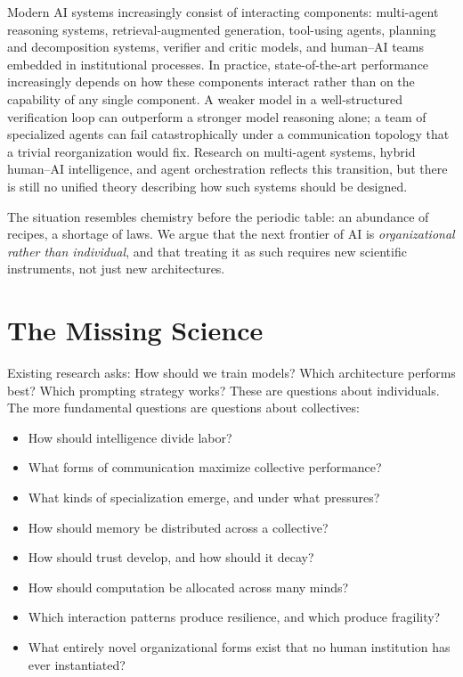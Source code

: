 \documentclass{article}
\begin{document}
Modern AI systems increasingly consist of interacting components: multi-agent reasoning systems, retrieval-augmented generation, tool-using agents, planning and decomposition systems, verifier and critic models, and human--AI teams embedded in institutional processes. In practice, state-of-the-art performance increasingly depends on how these components interact rather than on the capability of any single component. A weaker model in a well-structured verification loop can outperform a stronger model reasoning alone; a team of specialized agents can fail catastrophically under a communication topology that a trivial reorganization would fix. Research on multi-agent systems, hybrid human--AI intelligence, and agent orchestration reflects this transition, but there is still no unified theory describing how such systems should be designed.

The situation resembles chemistry before the periodic table: an abundance of recipes, a shortage of laws. We argue that the next frontier of AI is \emph{organizational rather than individual}, and that treating it as such requires new scientific instruments, not just new architectures.

\section{The Missing Science}

Existing research asks: How should we train models? Which architecture performs best? Which prompting strategy works? These are questions about individuals. The more fundamental questions are questions about collectives:

\begin{itemize}
  \item How should intelligence divide labor?
  \item What forms of communication maximize collective performance?
  \item What kinds of specialization emerge, and under what pressures?
  \item How should memory be distributed across a collective?
  \item How should trust develop, and how should it decay?
  \item How should computation be allocated across many minds?
  \item Which interaction patterns produce resilience, and which produce fragility?
  \item What entirely novel organizational forms exist that no human institution has ever instantiated?
\end{itemize}
\end{document}
